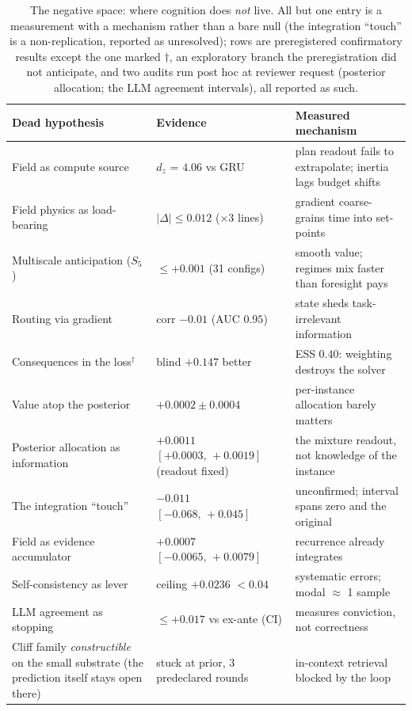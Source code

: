 \documentclass{article}
\newcommand{\VGBcero}{$+0.0002\pm0.0004$}
\newcommand{\LLMtecho}{$+0.0236$} \newcommand{\LLMtechoIC}{$[+0.0150,\,+0.0326]$}
\newcommand{\NGunoDelta}{$+0.0007$} \newcommand{\NGunoIC}{$[-0.0065,\,+0.0079]$}
\newcommand{\NdosESS}{$0.40$} \newcommand{\NdosBlind}{$+0.147$}
\newcommand{\FtresARtoque}{$-0.011$} \newcommand{\FtresARIC}{$[-0.068,\,+0.045]$}
\newcommand{\FdosDz}{$4.06$}
\newcommand{\Rasign}{$+0.0011$} \newcommand{\RasignIC}{$[+0.0003,\,+0.0019]$}
\begin{document}
\begin{table}[t]\centering\small
\begin{tabular}{@{}>{\raggedright\arraybackslash}p{}
>{\raggedright\arraybackslash}p{}
>{\raggedright\arraybackslash}p{}@{}}
\toprule
Dead hypothesis & Evidence & Measured mechanism\\
\midrule
Field as compute source & $d_z$ = \FdosDz{} vs GRU & plan readout fails to extrapolate; inertia lags budget shifts\\
Field physics as load-bearing & $|\Delta|\le0.012$ ($\times$3 lines) & gradient coarse-grains time into set-points\\
Multiscale anticipation ($S_5$) & $\le+0.001$ (31 configs) & smooth value; regimes mix faster than foresight pays\\
Routing via gradient & corr $-0.01$ (AUC $0.95$) & state sheds task-irrelevant information\\
Consequences in the loss$^\dagger$ & blind \NdosBlind{} better & ESS \NdosESS: weighting destroys the solver\\
Value atop the posterior & \VGBcero & per-instance allocation barely matters\\
Posterior allocation as information & \Rasign{} \RasignIC{} (readout fixed) & the mixture readout, not knowledge of the instance\\
The integration ``touch'' & \FtresARtoque{}~\FtresARIC & unconfirmed; interval spans zero and the original\\
Field as evidence accumulator & \NGunoDelta{} \NGunoIC & recurrence already integrates\\
Self-consistency as lever & ceiling \LLMtecho{} $<0.04$ & systematic errors; modal $\approx$ 1 sample\\
LLM agreement as stopping & $\le+0.017$ vs ex-ante (CI) & measures conviction, not correctness\\
Cliff family \emph{constructible} on the small substrate (the prediction itself stays open there) & stuck at prior, 3 predeclared rounds & in-context retrieval blocked by the loop\\
\bottomrule
\end{tabular}
\caption{The negative space: where cognition does \emph{not} live. All but one
entry is a measurement with a mechanism rather than a bare null (the
integration ``touch'' is a non-replication, reported as unresolved); rows are
preregistered confirmatory results except the one marked $\dagger$, an
exploratory branch the preregistration did not anticipate, and two audits run
post hoc at reviewer request (posterior allocation; the LLM agreement
intervals), all reported as such.}
\label{tab:negative}
\end{table}
\end{document}
